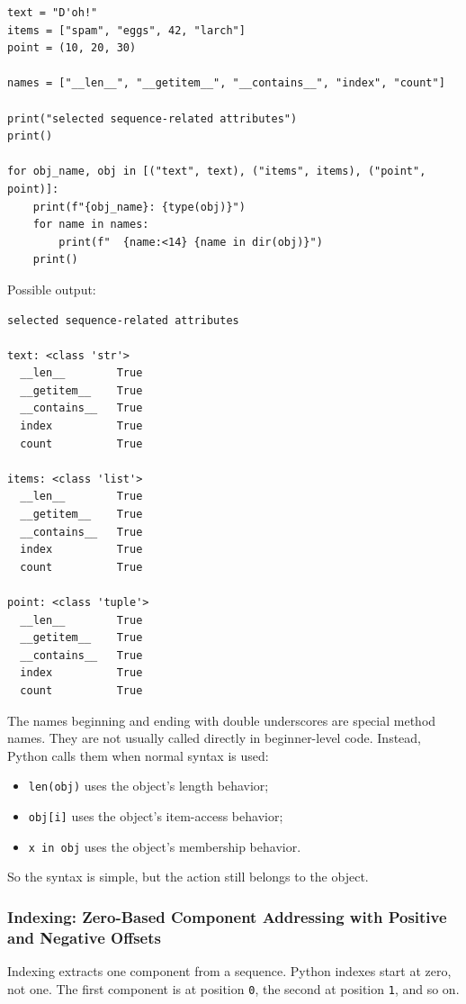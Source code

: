 \begin{verbatim}
text = "D'oh!"
items = ["spam", "eggs", 42, "larch"]
point = (10, 20, 30)

names = ["__len__", "__getitem__", "__contains__", "index", "count"]

print("selected sequence-related attributes")
print()

for obj_name, obj in [("text", text), ("items", items), ("point", point)]:
    print(f"{obj_name}: {type(obj)}")
    for name in names:
        print(f"  {name:<14} {name in dir(obj)}")
    print()
\end{verbatim}

Possible output:

\begin{verbatim}
selected sequence-related attributes

text: <class 'str'>
  __len__        True
  __getitem__    True
  __contains__   True
  index          True
  count          True

items: <class 'list'>
  __len__        True
  __getitem__    True
  __contains__   True
  index          True
  count          True

point: <class 'tuple'>
  __len__        True
  __getitem__    True
  __contains__   True
  index          True
  count          True
\end{verbatim}

The names beginning and ending with double underscores are special method names. They are not usually called directly in beginner-level code. Instead, Python calls them when normal syntax is used:

\begin{itemize}
    \item \texttt{len(obj)} uses the object's length behavior;
    \item \texttt{obj[i]} uses the object's item-access behavior;
    \item \texttt{x in obj} uses the object's membership behavior.
\end{itemize}

So the syntax is simple, but the action still belongs to the object.

\subsubsection{Indexing: Zero-Based Component Addressing with Positive and Negative Offsets}

Indexing extracts one component from a sequence. Python indexes start at zero, not one. The first component is at position \texttt{0}, the second at position \texttt{1}, and so on.

